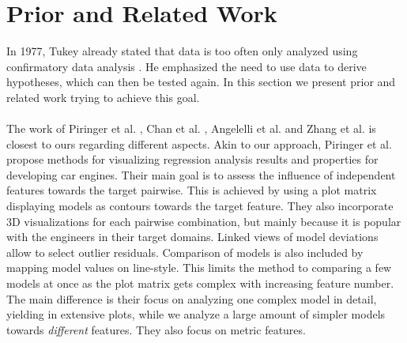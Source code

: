 \documentclass[journal]{style/vgtc} 			          %
\begin{document}
\section{Prior and Related Work}
In 1977, Tukey already stated that data is too often only analyzed using confirmatory data analysis \cite{Tukey}.
He emphasized the need to use data to derive hypotheses, which can then be tested again.
In this section we present prior and related work trying to achieve this goal.
\\\\
The work of Piringer et al. \cite{Piringer}, Chan et al. \cite{Chan}, Angelelli et al. \cite{Angelelli} and Zhang et al. \cite{Zhang2014} is closest to ours regarding different aspects.
Akin to our approach, Piringer et al. \cite{Piringer} propose methods for visualizing regression analysis results and properties for developing car engines.
Their main goal is to assess the influence of independent features towards the target pairwise.
This is achieved by using a plot matrix displaying models as contours towards the target feature.
They also incorporate 3D visualizations for each pairwise combination, but mainly because it is popular with the engineers in their target domains.
Linked views of model deviations allow to select outlier residuals.
Comparison of models is also included by mapping model values on line-style. %
This limits the method to comparing a few models at once as the plot matrix gets complex with increasing feature number.
The main difference is their focus on analyzing one complex model in detail, yielding in extensive plots, while we analyze a large amount of simpler models towards \emph{different} features.
They also focus on metric features. %
\end{document}
